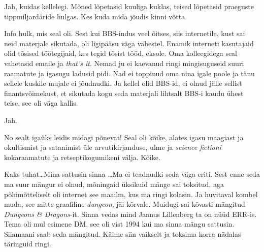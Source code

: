 
Jah, kuidas kellelegi. Mõned lõpetasid kuuliga kuklas, teised lõpetasid praeguste tippmiljardäride hulgas. Kes kuda mida jõudis kinni võtta.


Info hulk, mis seal oli. Sest kui BBS-indus veel õitses, siis internetile, kust sai neid materjale sikutada, oli ligipääsu väga vähestel. Enamik interneti kasutajaid olid tõsised töötegijaid, kes tegid tõsist tööd, eksole. Oma kolleegidega seal vahetasid emaile ja \emph{that's it}. Nemad ju ei kaevanud ringi mingisuguseid suuri raamatute ja igasugu ladusid pidi. Nad ei toppinud oma nina igale poole ja tänu sellele kuskile mujale ei jõudnudki. Ja kellel olid BBS-id, ei olnud jälle sellist finantsvõimekust, et sikutada kogu seda materjali lihtsalt BBS-i kaudu ühest teise, see oli väga kallis.
                 

Jah.


No sealt igaüks leidis midagi põnevat! Seal oli kõike, alates igasu maagiast ja okultismist ja satanimist üle arvutikirjanduse, ulme ja \emph{science fictioni} kokaraamatute ja retseptikogumikeni välja. Kõike.
                 
                 
Kaks tuhat\ldots Mina sattusin sinna \ldots Ma ei teadnudki seda väga eriti. Sest  enne seda ma suur mängur ei olnud, mõningaid üksikuid mänge  sai toksitud, aga põhimõtteliselt oli internet see maailm, kus ma ringi kolasin. Ja huvitaval kombel muda, see mitte-graafiline \emph{dungeon}, jäi kõrvale. Muidugi sai kõvasti mängitud \emph{Dungeons \& Dragons}-it. Sinna vedas mind Jaanus Lillenberg ta on nüüd ERR-is. Tema oli mul esimene DM, see oli vist 1994 kui ma sinna mängu sattusin. Siiamaani saab seda mängitud. Käime siin vaikselt ja toksima korra nädalas täringuid ringi.

